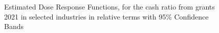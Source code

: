 \begin{figure}
    \centering
    
    \decoRule
    \caption[Response curves for liquidity through aid - by sectors 2]{Estimated Dose Response Functions, for the cash ratio from grants 2021 in selected industries in relative terms with 95\% Confidence Bands}
    \label{fig:Curve4}
\end{figure}